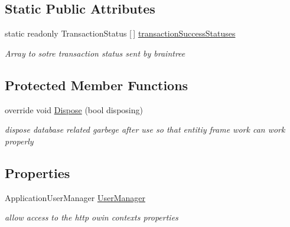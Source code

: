 \subsection*{Static Public Attributes}
\begin{DoxyCompactItemize}
\item 
static readonly Transaction\+Status \mbox{[}$\,$\mbox{]} \hyperlink{class_alfa_accounting_1_1_controllers_1_1_booking_view_models_controller_ad5c8b969ca7fc245ddaa2c9554832188}{transaction\+Success\+Statuses}
\begin{DoxyCompactList}\small\item\em Array to sotre transaction status sent by braintree \end{DoxyCompactList}\end{DoxyCompactItemize}
\subsection*{Protected Member Functions}
\begin{DoxyCompactItemize}
\item 
override void \hyperlink{class_alfa_accounting_1_1_controllers_1_1_booking_view_models_controller_a913b40e51291dff52c980cf14a02343c}{Dispose} (bool disposing)
\begin{DoxyCompactList}\small\item\em dispose database related garbege after use so that entitiy frame work can work properly \end{DoxyCompactList}\end{DoxyCompactItemize}
\subsection*{Properties}
\begin{DoxyCompactItemize}
\item 
Application\+User\+Manager \hyperlink{class_alfa_accounting_1_1_controllers_1_1_booking_view_models_controller_acc8f9d52de1f1e047284bab3a03de617}{User\+Manager}
\begin{DoxyCompactList}\small\item\em allow access to the http owin context\textquotesingle{}s properties \end{DoxyCompactList}\end{DoxyCompactItemize}
